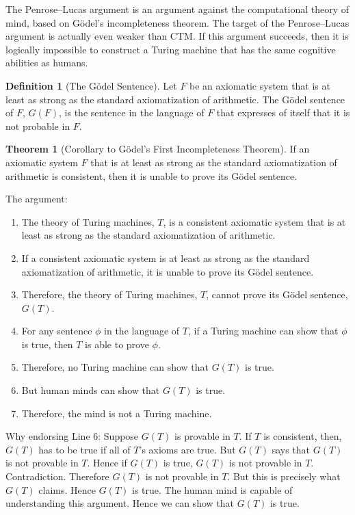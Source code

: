 \documentclass[11pt]{article}
\theoremstyle{definition}
\newtheorem*{theorem*}{Theorem}
\newtheorem*{defn*}{Definition}
\begin{document}
The Penrose–Lucas argument is an argument against the computational theory of mind, based on G\"odel's incompleteness theorem. The target of the Penrose–Lucas argument is actually even weaker than CTM. If this argument succeeds, then it is logically impossible to construct a Turing machine that has the same cognitive abilities as humans. 

\begin{defn*}[The G\"odel Sentence]
Let $F$ be an axiomatic system that is at least as strong as the standard axiomatization of arithmetic. The G\"odel sentence of $F$, $G(F)$, is the sentence in the language of $F$ that expresses of itself that it is not probable in $F$.
\end{defn*}

\begin{theorem*}[Corollary to G\"odel's First Incompleteness Theorem]
If an axiomatic system $F$ that is at least as strong as the standard axiomatization of arithmetic is consistent, then it is unable to prove its G\"odel sentence.
\end{theorem*}

The argument:
\begin{enumerate}
\item The theory of Turing machines, $T$, is a consistent axiomatic system that is at least as strong as the standard axiomatization of arithmetic.
\item If a consistent axiomatic system is at least as strong as the standard axiomatization of arithmetic, it is unable to prove its G\"odel sentence.
\item Therefore, the theory of Turing machines, $T$, cannot prove its G\"odel sentence, $G(T)$.
\item For any sentence $\phi$ in the language of $T$, if a Turing machine can show that $\phi$ is true, then $T$ is able to prove $\phi$.
\item Therefore, no Turing machine can show that $G(T)$ is true.
\item But human minds can show that $G(T)$ is true.
\item Therefore, the mind is not a Turing machine.
\end{enumerate}

\noindent
Why endorsing Line 6: Suppose $G(T)$ is provable in $T$. If $T$ is consistent, then, $G(T)$ has to be true if all of $T$'s axioms are true. But $G(T)$ says that $G(T)$ is not provable in $T$. Hence if $G(T)$ is true, $G(T)$ is not provable in $T$. Contradiction. Therefore $G(T)$ is not provable in $T$. But this is precisely what $G(T)$ claims. Hence $G(T)$ is true. The human mind is capable of understanding this argument. Hence we can show that $G(T)$ is true.
\end{document}
